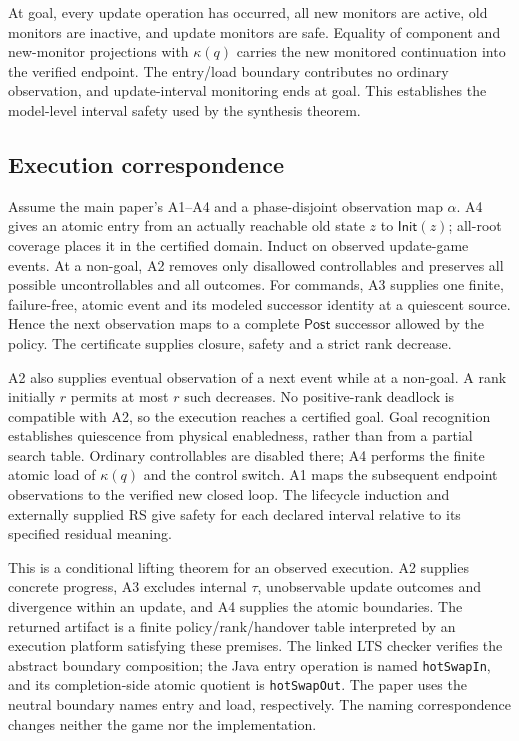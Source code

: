 \documentclass[11pt]{article}
\newcommand{\Post}{\mathsf{Post}}
\newcommand{\Init}{\mathsf{Init}}
\begin{document}
At goal, every update operation has occurred, all new monitors are active, old monitors are inactive, and update monitors are safe. Equality of component and new-monitor projections with $\kappa(q)$ carries the new monitored continuation into the verified endpoint. The entry/load boundary contributes no ordinary observation, and update-interval monitoring ends at goal. This establishes the model-level interval safety used by the synthesis theorem.

\subsection{Execution correspondence}
Assume the main paper's A1--A4 and a phase-disjoint observation map $\alpha$. A4 gives an atomic entry from an actually reachable old state $z$ to $\Init(z)$; all-root coverage places it in the certified domain. Induct on observed update-game events. At a non-goal, A2 removes only disallowed controllables and preserves all possible uncontrollables and all outcomes. For commands, A3 supplies one finite, failure-free, atomic event and its modeled successor identity at a quiescent source. Hence the next observation maps to a complete $\Post$ successor allowed by the policy. The certificate supplies closure, safety and a strict rank decrease.

A2 also supplies eventual observation of a next event while at a non-goal. A rank initially $r$ permits at most $r$ such decreases. No positive-rank deadlock is compatible with A2, so the execution reaches a certified goal. Goal recognition establishes quiescence from physical enabledness, rather than from a partial search table. Ordinary controllables are disabled there; A4 performs the finite atomic load of $\kappa(q)$ and the control switch. A1 maps the subsequent endpoint observations to the verified new closed loop. The lifecycle induction and externally supplied RS give safety for each declared interval relative to its specified residual meaning.

This is a conditional lifting theorem for an observed execution. A2 supplies concrete progress, A3 excludes internal $\tau$, unobservable update outcomes and divergence within an update, and A4 supplies the atomic boundaries. The returned artifact is a finite policy/rank/handover table interpreted by an execution platform satisfying these premises. The linked LTS checker verifies the abstract boundary composition; the Java entry operation is named \texttt{hotSwapIn}, and its completion-side atomic quotient is \texttt{hotSwapOut}. The paper uses the neutral boundary names entry and load, respectively. The naming correspondence changes neither the game nor the implementation.
\end{document}
